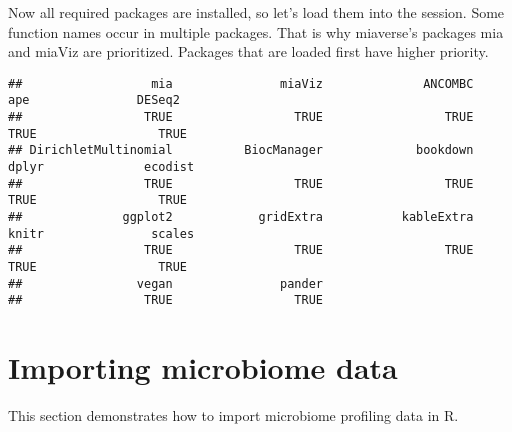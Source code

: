 \documentclass[
  oneside]{book}
\newenvironment{Shaded}{\begin{snugshade}}{\end{snugshade}}
\newcommand{\CommentTok}[1]{\textcolor[rgb]{0.56,0.35,0.01}{\textit{#1}}}
\newcommand{\DataTypeTok}[1]{\textcolor[rgb]{0.13,0.29,0.53}{#1}}
\newcommand{\KeywordTok}[1]{\textcolor[rgb]{0.13,0.29,0.53}{\textbf{#1}}}
\newcommand{\NormalTok}[1]{#1}
\newcommand{\OperatorTok}[1]{\textcolor[rgb]{0.81,0.36,0.00}{\textbf{#1}}}
\newcommand{\OtherTok}[1]{\textcolor[rgb]{0.56,0.35,0.01}{#1}}
\newcommand{\StringTok}[1]{\textcolor[rgb]{0.31,0.60,0.02}{#1}}
\begin{document}
Now all required packages are installed, so let's load them into the session.
Some function names occur in multiple packages. That is why miaverse's packages
mia and miaViz are prioritized. Packages that are loaded first have higher priority.

\begin{Shaded}
\end{Shaded}

\begin{verbatim}
##                  mia               miaViz              ANCOMBC                  ape               DESeq2 
##                 TRUE                 TRUE                 TRUE                 TRUE                 TRUE 
## DirichletMultinomial          BiocManager             bookdown                dplyr              ecodist 
##                 TRUE                 TRUE                 TRUE                 TRUE                 TRUE 
##              ggplot2            gridExtra           kableExtra                knitr               scales 
##                 TRUE                 TRUE                 TRUE                 TRUE                 TRUE 
##                vegan               pander 
##                 TRUE                 TRUE
\end{verbatim}

\hypertarget{importing-microbiome-data}{%
\chapter{Importing microbiome data}\label{importing-microbiome-data}}

This section demonstrates how to import microbiome profiling data in R.
\end{document}
